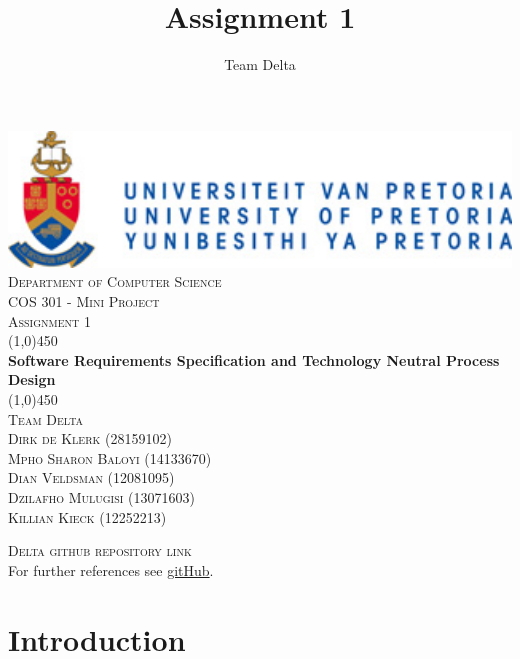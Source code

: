 \documentclass[a4paper,12pt]{report}
\author{Team Delta}
\title{ Assignment 1}
\begin{document}
\setlength{\parskip}{6pt}

	\begin{titlepage}
		\begin{center}
			\includegraphics[width=1\textwidth]{./up-logo.jpg}\\[1.5cm] 
			\textsc{\LARGE Department of Computer Science} \\ [.5cm]
			\textsc{\Large COS 301 - Mini Project} \\ [.5cm]
			\textsc{\Large Assignment 1} \\ [1.5cm]
			\line(1,0){450}\\[.5cm]
			\huge{\bfseries Software Requirements Specification and Technology Neutral Process Design}\\
			\line(1,0){450}\\[1cm]
			\textsc{\LARGE Team Delta}\\ [1cm]
			
			\textsc{\Large Dirk de Klerk (28159102)}\\
			\textsc{\Large Mpho Sharon Baloyi (14133670)}\\
			\textsc{\Large Dian Veldsman (12081095)}\\
			\textsc{\Large Dzilafho Mulugisi (13071603)}\\
			\textsc{\Large Killian Kieck (12252213)}\\
			
		\end{center}
	\end{titlepage}
\footnotesize
\normalsize

\renewcommand{\thesection}{\arabic{section}}
\newpage
\begin{center}
\textsc{\Large Delta github repository link}\\[0.5cm]
For further references see \href{https://github.com/u12081095/COS301-Team-Delta}{gitHub}.
\end{center}


\newpage
\section{Introduction}
\end{document}
